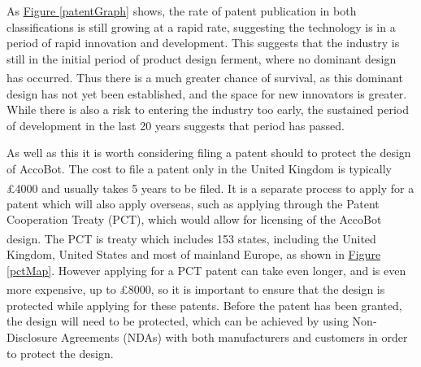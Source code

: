 \documentclass[11pt]{article}		%
\newcommand{\supercite}[1]{\textsuperscript{\cite{#1}}}		%
\newcommand{\figref}[1]{\hyperref[#1]{Figure \ref*{#1}}}    %
\begin{document}
		As \figref{patentGraph} shows, the rate of patent publication in both classifications is still growing at a rapid rate, suggesting the technology is in a period of rapid innovation and development.
		This suggests that the industry is still in the initial period of product design ferment, where no dominant design has occurred\supercite{christensen1998innovation}.
		Thus there is a much greater chance of survival, as this dominant design has not yet been established, and the space for new innovators is greater.
		While there is also a risk to entering the industry too early, the sustained period of development in the last 20 years suggests that period has passed.
		
		As well as this it is worth considering filing a patent should to protect the design of AccoBot.
		The cost to file a patent only in the United Kingdom is typically £4000 and usually takes 5 years to be filed\supercite{uk2020patenting}.
		It is a separate process to apply for a patent which will also apply overseas, such as applying through the Patent Cooperation Treaty (PCT), which would allow for licensing of the AccoBot design.
		The PCT is treaty which includes 153 states\supercite{pct2020states}, including the United Kingdom, United States and most of mainland Europe, as shown in \figref{pctMap}.
		However applying for a PCT patent can take even longer, and is even more expensive, up to £8000\supercite{mewburn2020international}, so it is important to ensure that the design is protected while applying for these patents.
		Before the patent has been granted, the design will need to be protected, which can be achieved by using Non-Disclosure Agreements (NDAs) with both manufacturers and customers in order to protect the design.
		
\end{document}
